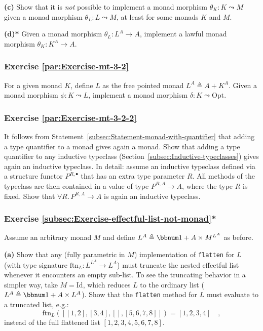 \textbf{(c)} Show that it is \emph{not} possible to implement a monad
morphism $\theta_{K}:K\leadsto M$ given a monad morphism $\theta_{L}:L\leadsto M$,
at least for some monads $K$ and $M$.

\textbf{(d){*}} Given a monad morphism $\theta_{L}:L^{A}\rightarrow A$,
implement a lawful monad morphism $\theta_{K}:K^{A}\rightarrow A$. 

\subsubsection{Exercise \label{par:Exercise-mt-3-2}\ref{par:Exercise-mt-3-2}}

For a given monad $K$, define $L$ as the free pointed monad $L^{A}\triangleq A+K^{A}$.
Given a monad morphism $\phi:K\leadsto L$, implement a monad morphism
$\delta:K\leadsto\text{Opt}$.

\subsubsection{Exercise \label{par:Exercise-mt-3-2-2}\ref{par:Exercise-mt-3-2-2}}

It follows from Statement~\ref{subsec:Statement-monad-with-quantifier}
that adding a type quantifier to a monad gives again a monad. Show
that adding a type quantifier to any inductive typeclass (Section~\ref{subsec:Inductive-typeclasses})
gives again an inductive typeclass. In detail: assume an inductive
typeclass defined via a structure functor $P^{R,\bullet}$ that has
an extra type parameter $R$. All methods of the typeclass are then
contained in a value of type $P^{R,A}\rightarrow A$, where the type
$R$ is fixed. Show that $\forall R.\,P^{R,A}\rightarrow A$ is again
an inductive typeclass.

\subsubsection{Exercise \label{subsec:Exercise-effectful-list-not-monad}\ref{subsec:Exercise-effectful-list-not-monad}{*}}

Assume an arbitrary monad $M$ and define $L^{A}\triangleq\bbnum 1+A\times M^{L^{A}}$
as before.

\textbf{(a)} Show that any (fully parametric in $M$) implementation
of \lstinline!flatten! for $L$ (with type signature $\text{ftn}_{L}:L^{L^{A}}\rightarrow L^{A}$)
must truncate the nested effectful list whenever it encounters an
empty sub-list. To see the truncating behavior in a simpler way, take
$M=\text{Id}$, which reduces $L$ to the ordinary list ($L^{A}\triangleq\bbnum 1+A\times L^{A}$).
Show that the \lstinline!flatten! method for $L$ must evaluate to
a truncated list, e.g.:
\[
\text{ftn}_{L}(\left[\left[1,2\right],\left[3,4\right],\left[\right],\left[5,6,7,8\right]\right])=\left[1,2,3,4\right]\quad,
\]
instead of the full flattened list $\left[1,2,3,4,5,6,7,8\right]$. 

